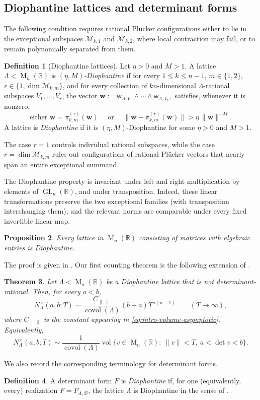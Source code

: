 \documentclass[reqno,11pt]{amsart}
\numberwithin{equation}{section}
\newtheorem{theorem}{Theorem}[section]
\newtheorem{proposition}[theorem]{Proposition}
\theoremstyle{definition}
\newtheorem{definition}[theorem]{Definition}
\theoremstyle{remark}
\newcommand{\op}{\operatorname}
\newcommand{\M}{\op{M}}
\newcommand{\GL}{\op{GL}}
\newcommand{\covol}{\op{covol}}
\begin{document}
\subsection{Diophantine lattices and determinant forms}
The following condition requires rational Pl\"ucker configurations either
to lie in the exceptional subspaces $\mathcal M_{k,1}$ and
$\mathcal M_{k,2}$, where local contraction may fail, or to remain
polynomially separated from them.

\begin{definition}[Diophantine lattices]\label{lattice_Diophantine}
Let $\eta>0$ and $M>1$. A lattice
$\Lambda<\M_n(\mathbb R)$ is \emph{$(\eta,M)$-Diophantine} if  for every $1\le k\le n-1$,  $m\in\{1,2\}$, 
$r\in\{1,\dim\mathcal M_{k,m}\}$, and for every collection of $kn$-dimensional
$\Lambda$-rational subspaces $V_1,\ldots,V_r$, 
the vector
$
\mathbf w
:=
\mathsf w_{\Lambda,V_1}\wedge\cdots\wedge
\mathsf w_{\Lambda,V_r},
$ 
satisfies, whenever it is nonzero,
$$\text{either }
\mathbf w=\pi_{k,m}^{(r)}(\mathbf w)\quad \text{ or }\quad 
\|\mathbf w-\pi_{k,m}^{(r)}(\mathbf w)\|
>
\eta\,\|\mathbf w\|^{-M}.
$$
A lattice is \emph{Diophantine} if it is $(\eta,M)$-Diophantine for some
$\eta>0$ and $M>1$.
\end{definition}

 The case
$r=1$ controls individual rational subspaces, while the case
$r=\dim\mathcal M_{k,m}$ rules out configurations of rational
Pl\"ucker vectors that nearly span an entire exceptional summand.

The Diophantine property is invariant under left and right multiplication by
elements of $\GL_n(\mathbb R)$, and under transposition. Indeed, these
linear transformations preserve the two exceptional families (with
transposition interchanging them), and the relevant norms are comparable
under every fixed invertible linear map.


\begin{proposition}\label{prop:algebraicityimpliesDiophantine}
Every lattice in $\M_n(\mathbb R)$ consisting of matrices with
algebraic entries is Diophantine.
\end{proposition}
The proof is given in .
Our first counting theorem is the following extension of
. \begin{theorem}\label{main}
Let $\Lambda<\M_n(\mathbb R)$ be a Diophantine lattice that is not
determinant-rational. Then, for every $a<b$,
$$
N_\Lambda^\times(a,b;T)
\sim
\frac{C_{\|\cdot\|}}{\covol(\Lambda)}
(b-a)T^{n(n-1)}
\qquad (T\to\infty),
$$
where $C_{\|\cdot\|}$ is the constant appearing in
\eqref{eq:intro-volume-asymptotic}. Equivalently,
$$
N_\Lambda^\times(a,b;T)
\sim
\frac{1}{\covol(\Lambda)}
\operatorname{vol}
\{v\in\M_n(\mathbb R):\ \|v\|<T,\ a<\det v<b\}.
$$
\end{theorem}
We also record the corresponding terminology for determinant forms.
\begin{definition}\label{form_Diophantine}
A determinant form $F$ is \emph{Diophantine} if, for one (equivalently,
every) realization $F=F_{\Lambda,\mathcal B}$, the lattice $\Lambda$ is
Diophantine in the sense of .
\end{definition}
\end{document}
